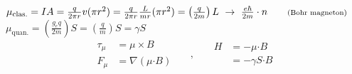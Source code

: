 \documentclass[12pt]{article}
\newcommand*{\dotP}{\boldsymbol \cdot}	%
\begin{document}
\vspace{10pt} \noindent
\(
    \mu_\text{clas.} = IA = \frac{q}{2 \pi r} v (\pi r^2) 
    = \frac{q}{2 \pi r} \frac{L}{m r} (\pi r^2) 
    = \left( \frac{q}{2m} \right) L 
    \ \rightarrow \ \frac{e\hbar}{2m} \cdot n 
    \hspace{20pt} \text{\scriptsize(Bohr magneton)}
\)\\[10pt]
\(
    \mu_\text{quan.} = \left( \frac{g_e q}{2m} \right) S = \left( \frac{q}{m} \right) S = \gamma S
\)
\[
    \begin{aligned}
        \tau_\mu &= \mu \times B \\[5pt]
        F_\mu &= \nabla(\mu \dotP B)
    \end{aligned}
    \hspace{18pt} , \hspace{18pt}\begin{aligned}
        H &= -\mu \dotP B \\[5pt]
        &= - \gamma S \dotP B
    \end{aligned}
\]
\end{document}
